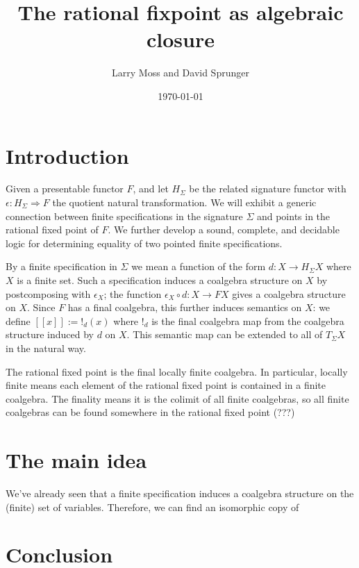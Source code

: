 \documentclass{article}
\title{The rational fixpoint as algebraic closure}
\author{Larry Moss and David Sprunger }
\date{\today}
\def\e{\epsilon}
\def\Ra{\Rightarrow}
\def\S{\Sigma}
\begin{document}
\maketitle

\section{Introduction}

Given a presentable functor $F$, and let $H_\S$ be the related signature functor with $\e: H_\S\Ra F$ the quotient natural transformation. We will exhibit a generic connection between finite specifications in the signature $\S$ and points in the rational fixed point of $F$. We further develop a sound, complete, and decidable logic for determining equality of two pointed finite specifications.

By a finite specification in $\S$ we mean a function of the form $d: X \to H_\S X$ where $X$ is a finite set. Such a specification induces a coalgebra structure on $X$ by postcomposing with $\e_X$; the function $\e_X \circ d: X \to FX$ gives a coalgebra structure on $X$. Since $F$ has a final coalgebra, this further induces semantics on $X$: we define $[[x]] := !_d(x)$ where $!_d$ is the final coalgebra map from the coalgebra structure induced by $d$ on $X$. This semantic map can be extended to all of $T_\S X$ in the natural way.

 The rational fixed point is the final locally finite coalgebra. In particular, locally finite means each element of the rational fixed point is contained in a finite coalgebra. The finality means it is the colimit of all finite coalgebras, so all finite coalgebras can be found somewhere in the rational fixed point (???)

\section{The main idea}

We've already seen that a finite specification induces a coalgebra structure on the (finite) set of variables. Therefore, we can find an isomorphic copy of 

\section{Conclusion}

\newpage
\listoftodos
\end{document}
